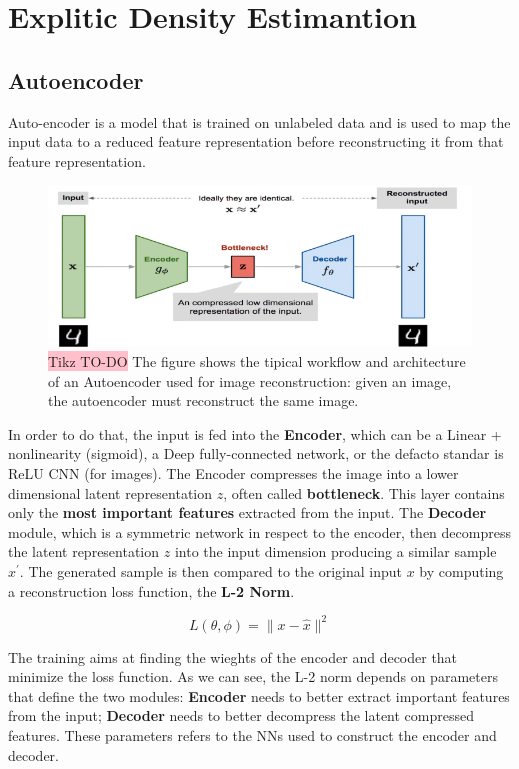 \section{Explitic Density Estimantion}



\subsection{Autoencoder}

Auto-encoder is a model that is trained on unlabeled data and is used to map the input data to a reduced feature representation before reconstructing it  from that feature representation.

\begin{figure}[!htbp]
    \centering
    \includegraphics[width=1\linewidth]{tikz/Autoencoder.png}
    \caption{{\color{red}\colorbox{pink}{Tikz TO-DO}} The figure shows the tipical workflow and architecture of an Autoencoder used for image reconstruction: given an image, the autoencoder must reconstruct the same image.}
    \label{fig:autoencoder}
\end{figure}

In order to do that, the input is fed into the \textbf{Encoder}, which can be a Linear + nonlinearity (sigmoid), a Deep fully-connected network, or the defacto standar is ReLU CNN (for images). The Encoder compresses the image into a lower dimensional latent representation $z$, often called \textbf{bottleneck}. This layer contains only the \textbf{most important features} extracted from the input. The \textbf{Decoder} module, which is a symmetric network in respect to the encoder, then decompress the latent representation $z$ into the input dimension producing a similar sample $x^{'}$.  The generated sample is then compared to the original input $x$ by computing a reconstruction loss function, the \textbf{L-2 Norm}.

$$ L(\theta, \phi) = \|x-\hat{x}\|^2 $$

The training aims at finding the wieghts of the encoder and decoder that minimize the loss function. As we can see, the L-2 norm depends on parameters that define the two modules: \textbf{Encoder} needs to better extract important features from the input; \textbf{Decoder} needs to better decompress the latent compressed features. These parameters refers to the NNs used to construct the encoder and decoder.

